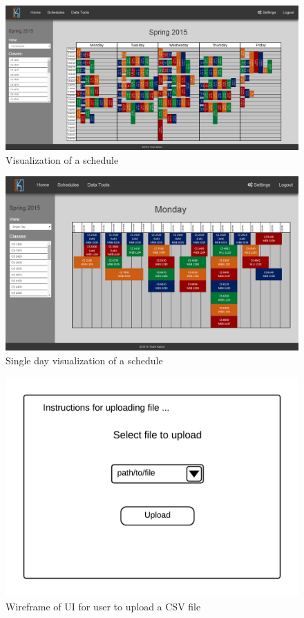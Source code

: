 \documentclass{extarticle}
\begin{document}
\begin{appendices}
\begin{figure}[!ht]
    \centering
    \includegraphics[width=1.0\textwidth]{img/full-sched-view}
    \caption{Visualization of a schedule}
    \label{fig:full-sched-view}
\end{figure}

\begin{figure}[!ht]
    \centering
    \includegraphics[width=1.0\textwidth]{img/single-day-view}
    \caption{Single day visualization of a schedule}
    \label{fig:single-day-view}
\end{figure}

\begin{figure}[!ht]
    \centering
    \includegraphics[width=1.0\textwidth]{img/upload_page_wireframe}
    \caption{Wireframe of UI for user to upload a CSV file}
    \label{fig:upload_page_wireframe}
\end{figure}


\end{appendices}
\end{document}
